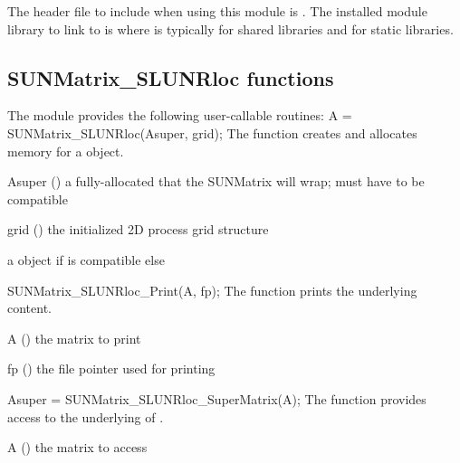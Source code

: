 \noindent The header file to include when using this module
is . The installed module
library to link to is 
where  is typically  for shared libraries and
 for static libraries.


\subsection{SUNMatrix\_SLUNRloc functions}
\label{ss:sunmat_slunrloc_functions}

The module {\sunmatslunrloc} provides the following user-callable routines:
{
  A = SUNMatrix\_SLUNRloc(Asuper, grid);
}
{
  The function  creates and allocates memory for a
  {\sunmatslunrloc} object.
}
{
  \begin{args}
  \item[Asuper] ()
      a fully-allocated {\superludist}  that the SUNMatrix will
      wrap; must have 
      to be compatible
  \item[grid] () the initialized {\superludist} 2D process grid structure
  \end{args}
}
{
  a  object if  is compatible else 
}
{
}

{
  SUNMatrix\_SLUNRloc\_Print(A, fp);
}
{
  The function  prints the underlying
   content.
}
{
  \begin{args}
  \item[A] () the matrix to print
  \item[fp] () the file pointer used for printing
  \end{args}
}
{
}
{
}

{
  Asuper = SUNMatrix\_SLUNRloc\_SuperMatrix(A);
}
{
  The function  provides access
  to the underlying {\superludist}  of .
}
{
  \begin{args}
  \item[A] () the matrix to access
  \end{args}
}
{
}
{
}


